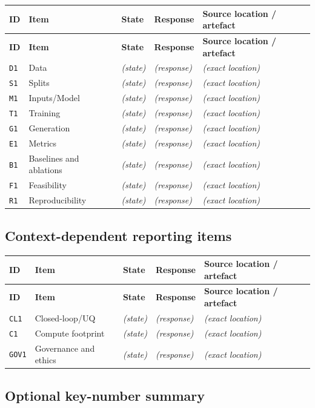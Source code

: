 \documentclass[10pt,a4paper]{article}
\newcommand{\ResponseTableHeader}{%
\toprule
\textbf{ID} & \textbf{Item} & \textbf{State} & \textbf{Response} & \textbf{Source location / artefact}\\
\midrule}
\begin{document}
\begin{longtable}{@{}L{0.05\textwidth} N{0.16\textwidth} L{0.14\textwidth} L{0.37\textwidth} L{0.20\textwidth}@{}}
\ResponseTableHeader
\endfirsthead
\ResponseTableHeader
\endhead
\bottomrule
\endfoot
\texttt{D1} & Data & \emph{(state)} & \emph{(response)} & \emph{(exact location)}\\
\texttt{S1} & Splits & \emph{(state)} & \emph{(response)} & \emph{(exact location)}\\
\texttt{M1} & Inputs/Model & \emph{(state)} & \emph{(response)} & \emph{(exact location)}\\
\texttt{T1} & Training & \emph{(state)} & \emph{(response)} & \emph{(exact location)}\\
\texttt{G1} & Generation & \emph{(state)} & \emph{(response)} & \emph{(exact location)}\\
\texttt{E1} & Metrics & \emph{(state)} & \emph{(response)} & \emph{(exact location)}\\
\texttt{B1} & Baselines and ablations & \emph{(state)} & \emph{(response)} & \emph{(exact location)}\\
\texttt{F1} & Feasibility & \emph{(state)} & \emph{(response)} & \emph{(exact location)}\\
\texttt{R1} & Reproducibility & \emph{(state)} & \emph{(response)} & \emph{(exact location)}\\
\end{longtable}

\subsection*{Context-dependent reporting items}

\begin{longtable}{@{}L{0.05\textwidth} N{0.16\textwidth} L{0.14\textwidth} L{0.37\textwidth} L{0.20\textwidth}@{}}
\ResponseTableHeader
\endfirsthead
\ResponseTableHeader
\endhead
\bottomrule
\endfoot
\texttt{CL1} & Closed-loop/UQ & \emph{(state)} & \emph{(response)} & \emph{(exact location)}\\
\texttt{C1} & Compute footprint & \emph{(state)} & \emph{(response)} & \emph{(exact location)}\\
\texttt{GOV1} & Governance and ethics & \emph{(state)} & \emph{(response)} & \emph{(exact location)}\\
\end{longtable}

\subsection*{Optional key-number summary}
\end{document}
